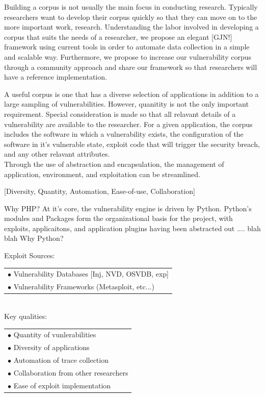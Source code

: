 \documentclass[letterpaper,twocolumn,10pt]{article}
\begin{document}
Building a corpus is not usually the main focus in conducting research.  Typically researchers want to develop their corpus quickly so that they can move on to the more important work, research. 
Understanding the labor involved in developing a corpus that suits the needs of a researcher, we propose an elegant [GJN!] framework using current tools in order to automate data collection in a simple and scalable way.  
Furthermore, we propose to increase our vulnerability corpus through a community approach and share our framework so that researchers will have a reference implementation.


A useful corpus is one that has a diverse selection of applications in addition to a large sampling of vulnerabilities. However, quanitity is not the only important requirement. Special consideration is made so that all relavant details of a vulnerability are available to the researcher. For a given application, the corpus includes the software in which a vulnerability exists, the configuration of the software in it's vulnerable state, exploit code that will trigger the security breach, and any other relavant attributes.\\
Through the use of abstraction and encapsulation, the management of application, environment, and exploitation can be streamlined. 

[Diversity, Quantity, Automation, Ease-of-use, Collaboration]

Why PHP?
At it's core, the vulnerability engine is driven by Python. Python's modules and Packages form the organizational basis for the project, with exploits, applicaitons, and application plugins having been abstracted out .... blah blah
Why Python?

Exploit Sources:\\
 \begin{tabular} { l }
   $\bullet$ Vulnerability Databases [Inj, NVD, OSVDB, exp]\\
   $\bullet$ Vulnerability Frameworks (Metasploit, etc...)\\
 \end{tabular}
\\

Key qualities:\\
 \begin{tabular}{ l }
   $\bullet$ Quantity of vunlerabilities\\
   $\bullet$ Diversity of applications\\
   $\bullet$ Automation of trace collection\\
   $\bullet$ Collaboration from other researchers\\
   $\bullet$ Ease of exploit implementation\\

 \end{tabular}
\\
\end{document}
